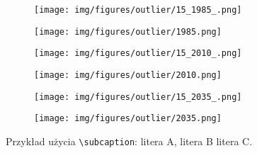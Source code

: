 \begin{figure}[h]
	\centering
	\begin{subfigure}{0.35\textwidth}
		\centering\texttt{[image: img/figures/outlier/15\_1985\_.png]}
		\subcaption{\label{subfigure_a}}
	\end{subfigure}
	\begin{subfigure}{0.35\textwidth}
		\centering\texttt{[image: img/figures/outlier/1985.png]}
		\subcaption{\label{subfigure_a1}}
	\end{subfigure}
	\begin{subfigure}{0.35\textwidth}
		\centering\texttt{[image: img/figures/outlier/15\_2010\_.png]}
		\subcaption{\label{subfigure_b}}
	\end{subfigure}
	\begin{subfigure}{0.35\textwidth}
		\centering\texttt{[image: img/figures/outlier/2010.png]}
		\subcaption{\label{subfigure_b1}}
	\end{subfigure}
	\begin{subfigure}{0.35\textwidth}
		\centering\texttt{[image: img/figures/outlier/15\_2035\_.png]}
		\subcaption{\label{subfigure_c}}
	\end{subfigure}
	\begin{subfigure}{0.35\textwidth}
		\centering\texttt{[image: img/figures/outlier/2035.png]}
		\subcaption{\label{subfigure_c}}
	\end{subfigure}
	
	\caption{\label{fig:subcaption_example}Przykład użycia \texttt{\textbackslash subcaption}: \protect{} litera A,
	\protect{} litera B \protect{} litera C.}
\end{figure}

